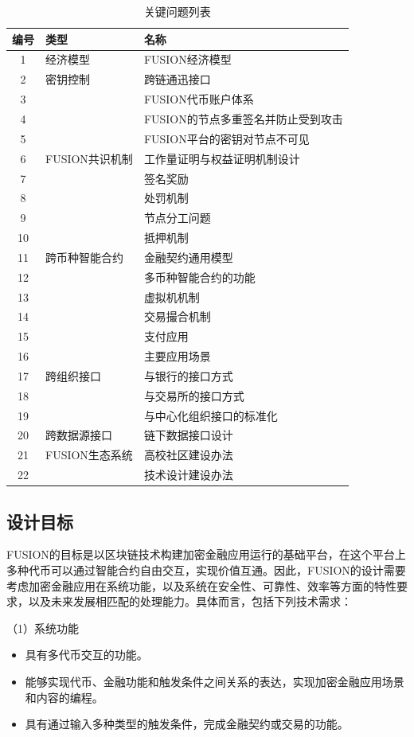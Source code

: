 \documentclass[a4paper,12pt]{article}
\begin{document}
\renewcommand\tablename{表}
\begin{table}[!hbp]
  \caption{关键问题列表}
  \label{tbl:keyquestions}
  \centering
  \begin{tabular}{|c|l|l|}
\hline
编号	&	类型	&	名称	\\
\hline
1	&	经济模型	&	FUSION经济模型\\
2	&	密钥控制	&	跨链通迅接口	\\
3	&	 	&	FUSION代币账户体系	\\
4	&	 	&	FUSION的节点多重签名并防止受到攻击	\\
5	&	 	&	FUSION平台的密钥对节点不可见	\\
6	&	FUSION共识机制	&	工作量证明与权益证明机制设计	\\
7	&	 	&	签名奖励	\\
8	&	 	&	处罚机制	\\
9	&	 	&	节点分工问题	\\
10	&	 	&	抵押机制	\\
11	&	跨币种智能合约	&	金融契约通用模型	\\
12	&	 	&	多币种智能合约的功能	\\
13	&	 	&	虚拟机机制	\\
14	&	 	&	交易撮合机制	\\
15	&	 	&	支付应用	\\
16	&	 	&	主要应用场景	\\
17	&	跨组织接口	&	与银行的接口方式	\\
18	&	 	&	与交易所的接口方式	\\
19	&	 	&	与中心化组织接口的标准化	\\
20	&	跨数据源接口	&	链下数据接口设计	\\
21	&	FUSION生态系统	&	高校社区建设办法	\\
22	&	 	&	技术设计建设办法	\\
  \hline
 \end{tabular}
\end{table}


\subsection{设计目标}

FUSION的目标是以区块链技术构建加密金融应用运行的基础平台，在这个平台上多种代币可以通过智能合约自由交互，实现价值互通。因此，FUSION的设计需要考虑加密金融应用在系统功能，以及系统在安全性、可靠性、效率等方面的特性要求，以及未来发展相匹配的处理能力。具体而言，包括下列技术需求：

（1）系统功能
\begin{itemize}[itemindent=1em]
	\item 具有多代币交互的功能。
	\item 能够实现代币、金融功能和触发条件之间关系的表达，实现加密金融应用场景和内容的编程。
	\item 具有通过输入多种类型的触发条件，完成金融契约或交易的功能。
\end{itemize}
\end{document}
